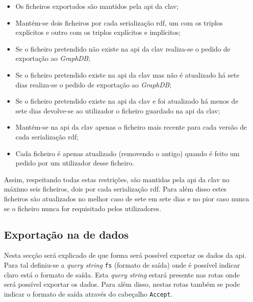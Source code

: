 \begin{itemize}
    \item Os ficheiros exportados são mantidos pela \acrshort{api} da \acrshort{clav};
    \item Mantém-se dois ficheiros por cada serialização \acrshort{rdf}, um com os triplos explícitos e outro com 
    os triplos explícitos e implícitos;
    \item Se o ficheiro pretendido não existe na \acrshort{api} da \acrshort{clav} realiza-se o pedido de exportação
     ao \textit{GraphDB};
    \item Se o ficheiro pretendido existe na \acrshort{api} da \acrshort{clav} mas não é atualizado há sete dias 
    realiza-se o pedido de exportação ao \textit{GraphDB};
    \item Se o ficheiro pretendido existe na \acrshort{api} da \acrshort{clav} e foi atualizado há menos de sete 
    dias devolve-se ao utilizador o ficheiro guardado na \acrshort{api} da \acrshort{clav};
    \item Mantém-se na \acrshort{api} da \acrshort{clav} apenas o ficheiro mais recente para cada versão de cada 
    serialização \acrshort{rdf};
    \item Cada ficheiro é apenas atualizado (removendo o antigo) quando é feito um pedido por um utilizador desse 
    ficheiro.
\end{itemize}

Assim, respeitando todas estas restrições, são mantidas pela \acrshort{api} da \acrshort{clav} no máximo seis 
ficheiros, dois por cada serialização \acrshort{rdf}. Para além disso estes ficheiros são atualizados no melhor 
caso de sete em sete dias e no pior caso nunca se o ficheiro nunca for requisitado pelos utilizadores.

\subsection{Exportação na  de dados}
Nesta secção será explicado de que forma será possível exportar os dados da \acrshort{api}. 
Para tal definiu-se a \textit{query string} \texttt{fs} (formato de saída) onde é possível indicar claro está o 
formato de saída. Esta \textit{query string} estará presente nas rotas onde será possível exportar os dados. 
Para além disso, nestas rotas também se pode indicar o formato de saída através do cabeçalho \texttt{Accept}.

